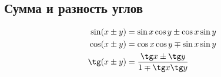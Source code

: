 \subsection*{Сумма и разность углов}

\begin{align*}
  \sin(x \pm y) &= \sin x \cos y \pm \cos x \sin y\\
  \cos(x \pm y) &= \cos x \cos y \mp \sin x \sin y\\
  \tg(x \pm y) &= \frac{\tg x \pm \tg y}{1 \mp \tg x \tg y}
\end{align*}

\hrulefill